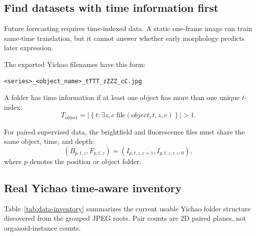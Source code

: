 \documentclass[11pt]{article}
\newcommand{\1}{\mathbf{1}}
\begin{document}
\subsection{Find datasets with time information first}
Future forecasting requires time-indexed data. A static one-frame image can train same-time translation, but it cannot answer whether early morphology predicts later expression.

The exported Yichao filenames have this form:
\begin{verbatim}
<series>_<object_name>_tTTT_zZZZ_cC.jpg
\end{verbatim}

A folder has time information if at least one object has more than one unique \(t\)-index:
\begin{equation}
T_{\mathrm{object}} =
\left|\left\{t : \exists z,c \;\mathrm{file}(object,t,z,c)\right\}\right| > 1 .
\end{equation}

For paired supervised data, the brightfield and fluorescence files must share the same object, time, and depth:
\begin{equation}
(B_{p,t,z},F_{p,t,z}) =
\left(I_{p,t,z,c=1}, I_{p,t,z,c=0}\right),
\end{equation}
where \(p\) denotes the position or object folder.

\subsection{Real Yichao time-aware inventory}
Table~\ref{tab:data-inventory} summarizes the current usable Yichao folder structure discovered from the grouped JPEG roots. Pair counts are 2D paired planes, not organoid-instance counts.
\end{document}
